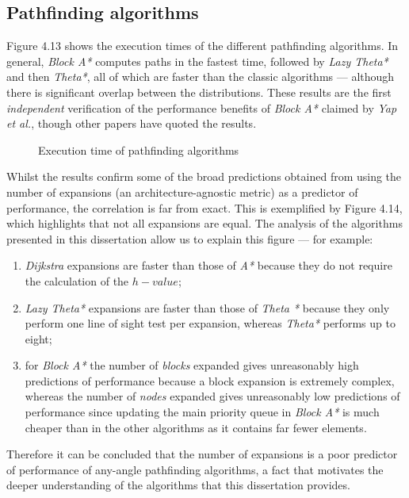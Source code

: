 \documentclass[12pt,notitlepage]{report}
\begin{document}
\subsection{Pathfinding algorithms}
Figure 4.13 shows the execution times of the different pathfinding algorithms. In general, {\em Block A*} computes paths in the fastest time, followed by {\em Lazy Theta*} and then {\em Theta*}, all of which are faster than the classic algorithms --- although there is significant overlap between the distributions. These results are the first {\em independent} verification of the performance benefits of {\em Block A*} claimed by {\em Yap et al.}, though other papers have quoted the results\cite{Nash12}\cite{Nash13}.\\

\begin{figure}
\centering

\caption{Execution time of pathfinding algorithms}
\end{figure}

\noindent 
Whilst the results confirm some of the broad predictions obtained from using the number of expansions (an architecture-agnostic metric) as a predictor of performance, the correlation is far from exact. This is exemplified by Figure 4.14, which highlights that not all expansions are equal. The analysis of the algorithms presented in this dissertation allow us to explain this figure --- for example:
\begin{enumerate}
\item {\em Dijkstra} expansions are faster than those of {\em A*} because they do not require the calculation of the $h-value$;
\item {\em Lazy Theta*} expansions are faster than those of {\em Theta *} because they only perform one line of sight test per expansion, whereas {\em Theta*} performs up to eight;
\item for {\em Block A*} the number of {\em blocks} expanded gives unreasonably high predictions of performance because a block expansion is extremely complex, whereas the number of {\em nodes} expanded gives unreasonably low predictions of performance since updating the main priority queue in {\em Block A*} is much cheaper than in the other algorithms as it contains far fewer elements.
\end{enumerate}

\noindent
Therefore it can be concluded that the number of expansions is a poor predictor of performance of any-angle pathfinding algorithms, a fact that motivates the deeper understanding of the algorithms that this dissertation provides. 
\end{document}
